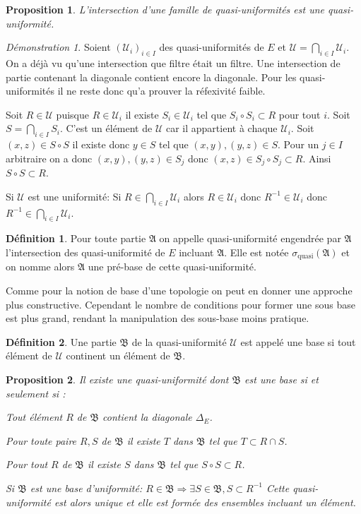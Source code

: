 \documentclass[a4paper, 11pt, french]{book}
\newenvironment{itemise}{\itemize}{\enditemize}
\theoremstyle{plain} %
\newtheorem{proposition}{Proposition}
\theoremstyle{definition} %
\newtheorem{definition}{Définition}
\theoremstyle{remark} %
\newtheorem*{demonstration}{Démonstration}
\newcommand{\1}{\mathds{1}}
\newcommand{\inv}[1]{#1^{-1}}
\renewcommand{\frak}[1]{\mathfrak{#1}}
\newcommand{\scr}[1]{\mathscr{#1}}
\newcommand{\rm}[1]{\mathrm{#1}}
\begin{document}
\begin{proposition}
	L'intersection d'une famille de quasi-uniformités est une quasi-uniformité.
\end{proposition}

\begin{demonstration}
	Soient $(\scr{U}_i)_{i\in I}$ des quasi-uniformités de $E$ et $\scr{U}=\bigcap_{i\in I}\scr{U}_i$.
	On a déjà vu qu'une intersection que filtre était un filtre.
	Une intersection de partie contenant la diagonale contient encore la diagonale.
	Pour les quasi-uniformités il ne reste donc qu'a prouver la réfexivité faible.
	
	Soit $R\in\scr{U}$ puisque $R\in\scr{U}_i$ il existe $S_i\in\scr{U}_i$ tel que $S_i\circ S_i\subset R$ pour tout $i$.
	Soit $S=\bigcap_{i\in I} S_i$.
	C'est un élément de $\scr{U}$ car il appartient à chaque $\scr{U}_i$.
	Soit $(x, z)\in S\circ S$ il existe donc $y\in S$ tel que $(x, y), (y, z)\in S$.
	Pour un $j\in I$ arbitraire on a donc $(x, y), (y, z)\in S_j$ donc $(x, z)\in S_j\circ S_j\subset R$.
	Ainsi $S\circ S\subset R$.

	Si $\scr{U}$ est une uniformité: Si $R\in\bigcap_{i\in I}\scr{U}_i$ alors $R\in\scr{U}_i$ donc $\inv{R}\in\scr{U}_i$ donc $\inv{R}\in\bigcap_{i\in I}\scr{U}_i$.
\end{demonstration}

\begin{definition}
	Pour toute partie $\frak{A}$ on appelle quasi-uniformité engendrée par $\frak{A}$ l'intersection des quasi-uniformité de $E$ incluant $\frak{A}$.
	Elle est notée $\sigma_\rm{quasi}(\frak{A})$ et on nomme alors $\frak{A}$ une pré-base de cette quasi-uniformité.
\end{definition}

Comme pour la notion de base d'une topologie on peut en donner une approche plus constructive.
Cependant le nombre de conditions pour former une sous base est plus grand, rendant la manipulation des sous-base moins pratique.

\begin{definition}
	Une partie $\frak{B}$ de la quasi-uniformité $\scr{U}$ est appelé une base si tout élément de $\scr{U}$ continent un élément de $\frak{B}$.
\end{definition}

\begin{proposition}
	Il existe une quasi-uniformité dont $\frak{B}$ est une base si et seulement si :
	\begin{itemise}
		\item Tout élément $R$ de $\frak{B}$ contient la diagonale $\Delta_E$.
		\item Pour toute paire $R, S$ de $\frak{B}$ il existe $T$ dans $\frak{B}$ tel que $T\subset R\cap S$.
		\item Pour tout $R$ de $\frak{B}$ il existe $S$ dans $\frak{B}$ tel que $S\circ S\subset R$.
		\item Si $\frak{B}$ est une base d'uniformité: $R\in\frak{B}\Rightarrow\exists S\in\frak{B}, S\subset R^{-1}$
	\end{itemise}
	Cette quasi-uniformité est alors unique et elle est formée des ensembles incluant un élément.%
\end{proposition}
\end{document}
